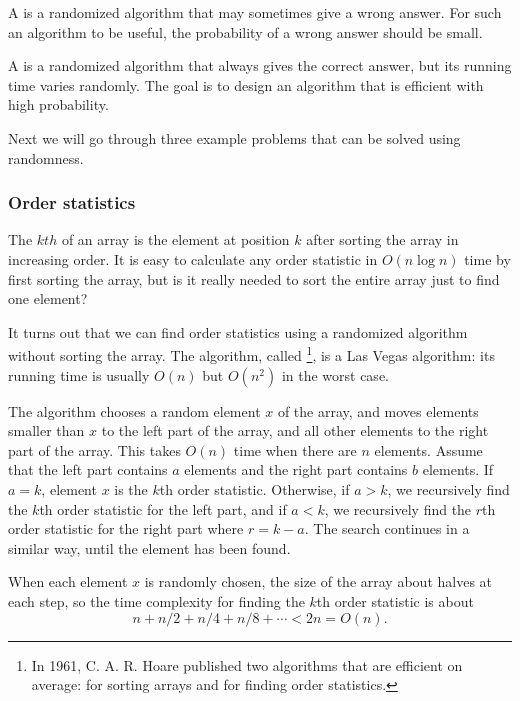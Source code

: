 
A  is a randomized algorithm
that may sometimes give a wrong answer.
For such an algorithm to be useful,
the probability of a wrong answer should be small.


A  is a randomized algorithm
that always gives the correct answer,
but its running time varies randomly.
The goal is to design an algorithm that is
efficient with high probability.

Next we will go through three example problems that
can be solved using randomness.

\subsubsection{Order statistics}


The $kth$  of an array
is the element at position $k$ after sorting
the array in increasing order.
It is easy to calculate any order statistic
in $O(n \log n)$ time by first sorting the array,
but is it really needed to sort the entire array
just to find one element?

It turns out that we can find order statistics
using a randomized algorithm without sorting the array.
The algorithm, called \footnote{In 1961,
C. A. R. Hoare published two algorithms that
are efficient on average:  
 \cite{hoa61a} for sorting arrays and
 \cite{hoa61b} for finding order statistics.}, is a Las Vegas algorithm:
its running time is usually $O(n)$
but $O(n^2)$ in the worst case.

The algorithm chooses a random element $x$
of the array, and moves elements smaller than $x$
to the left part of the array,
and all other elements to the right part of the array.
This takes $O(n)$ time when there are $n$ elements.
Assume that the left part contains $a$ elements
and the right part contains $b$ elements.
If $a=k$, element $x$ is the $k$th order statistic.
Otherwise, if $a>k$, we recursively find the $k$th order
statistic for the left part,
and if $a<k$, we recursively find the $r$th order
statistic for the right part where $r=k-a$.
The search continues in a similar way, until the element
has been found.

When each element $x$ is randomly chosen,
the size of the array about halves at each step,
so the time complexity for
finding the $k$th order statistic is about
\[n+n/2+n/4+n/8+\cdots < 2n = O(n).\]

